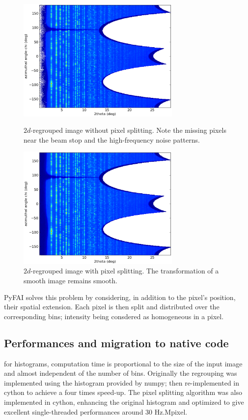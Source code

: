 \documentclass[a4paper]{jpconf}
\begin{document}
\begin{figure}[h]
\begin{minipage}{8cm}
\includegraphics[width=8cm]{img/2Dhistogram.eps}
\caption{\label{rough}$2d$-regrouped image without pixel splitting. Note the
missing pixels near the beam stop and the high-frequency noise patterns.}
\end{minipage}\hspace{5mm}
\begin{minipage}{8cm}
\includegraphics[width=8cm]{img/2DwithSplit.eps}
\caption{\label{smooth}$2d$-regrouped image with pixel splitting. The
transformation of a smooth image remains smooth.}
\end{minipage}
\end{figure}

PyFAI solves this problem by considering, in addition to the pixel's position,
their spatial extension. Each pixel is then split and distributed over the
corresponding bins; intensity being consdered as homogeneous in a pixel.

\subsection{Performances and migration to native code}
for histograms, computation time is proportional to the size of the input image
and almost independent of the number of bins. Originally the regrouping was implemented
using the histogram provided by numpy\cite{numpy}; then re-implemented in
cython\cite{cython} to achieve a four times speed-up.
The pixel splitting algorithm was also implemented in cython, enhancing the
original histogram and optimized to give excellent single-threaded performances
around 30 Hz.Mpixel.
\end{document}
